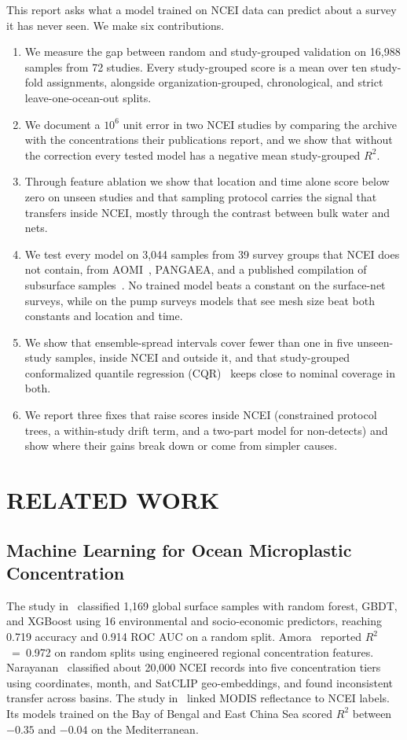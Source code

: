 \documentclass[12pt,a4paper]{report}
\newcommand{\Rsq}{$R^2$}
\begin{document}
This report asks what a model trained on NCEI data can predict about a survey it has never seen. We make six contributions.
\begin{enumerate}
\item We measure the gap between random and study-grouped validation on 16,988 samples from 72 studies. Every study-grouped score is a mean over ten study-fold assignments, alongside organization-grouped, chronological, and strict leave-one-ocean-out splits.
\item We document a $10^6$ unit error in two NCEI studies by comparing the archive with the concentrations their publications report, and we show that without the correction every tested model has a negative mean study-grouped \Rsq{}.
\item Through feature ablation we show that location and time alone score below zero on unseen studies and that sampling protocol carries the signal that transfers inside NCEI, mostly through the contrast between bulk water and nets.
\item We test every model on 3,044 samples from 39 survey groups that NCEI does not contain, from AOMI~\cite{aomi,isobe2021}, PANGAEA, and a published compilation of subsurface samples~\cite{zhao2025}. No trained model beats a constant on the surface-net surveys, while on the pump surveys models that see mesh size beat both constants and location and time.
\item We show that ensemble-spread intervals cover fewer than one in five unseen-study samples, inside NCEI and outside it, and that study-grouped conformalized quantile regression (CQR)~\cite{romano2019} keeps close to nominal coverage in both.
\item We report three fixes that raise scores inside NCEI (constrained protocol trees, a within-study drift term, and a two-part model for non-detects) and show where their gains break down or come from simpler causes.
\end{enumerate}

\chapter{RELATED WORK}

\section{Machine Learning for Ocean Microplastic Concentration}

The study in~\cite{zhen2023} classified 1,169 global surface samples with random forest, GBDT, and XGBoost using 16 environmental and socio-economic predictors, reaching 0.719 accuracy and 0.914 ROC AUC on a random split. Amora~\cite{amora2025} reported \Rsq{}~=~0.972 on random splits using engineered regional concentration features. Narayanan~\cite{narayanan2026} classified about 20,000 NCEI records into five concentration tiers using coordinates, month, and SatCLIP geo-embeddings, and found inconsistent transfer across basins. The study in~\cite{hafiz2026} linked MODIS reflectance to NCEI labels. Its models trained on the Bay of Bengal and East China Sea scored \Rsq{} between $-0.35$ and $-0.04$ on the Mediterranean.
\end{document}
